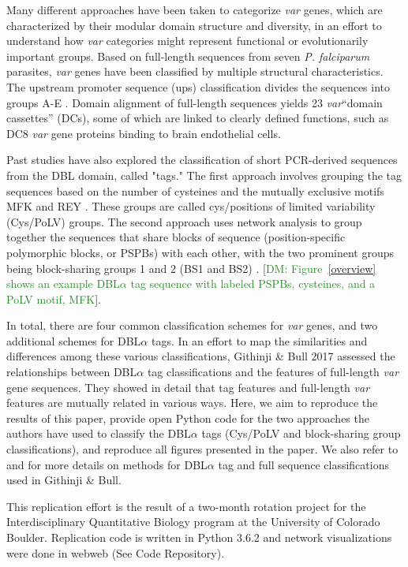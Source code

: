\documentclass[10pt,twocolumn,superscriptaddress]{revtex4-1}
\newcommand{\dieumycom}[1]{[\textcolor{ForestGreen}{DM: #1}]}
\newcommand{\var}{{\it var}\xspace}
\newcommand{\pf}{{\it P. falciparum}\xspace}
\newcommand{\dbla}{{DBL$\alpha$}\xspace}
\newcommand{\cp}{{Cys/PoLV}\xspace}
\newcommand{\paper}{{Githinji \& Bull}\xspace}
\begin{document}
Many different approaches have been taken to categorize \var genes, which are characterized by their modular domain structure and diversity, in an effort to understand how \var categories might represent functional or evolutionarily important groups. Based on full-length sequences from seven \pf parasites, \var genes have been classified by multiple structural characteristics. The upstream promoter sequence (ups) classification divides the sequences into groups A-E \cite{rask2010, vazquez2002}. Domain alignment of full-length sequences yields 23 \var ``domain cassettes'' (DCs), some of which are linked to clearly defined functions, such as DC8 \var gene proteins binding to brain endothelial cells. 



Past studies have also explored the classification of short PCR-derived sequences from the DBL domain, called "tags." The first approach involves grouping the tag sequences based on the number of cysteines and the mutually exclusive motifs MFK and REY \cite{bull2007}. These groups are called cys/positions of limited variability (\cp) groups. The second approach uses network analysis to group together the sequences that share blocks of sequence (position-specific polymorphic blocks, or PSPBs) with each other, with the two prominent groups being block-sharing groups 1 and 2 (BS1 and BS2) \cite{bull2008}. \dieumycom{Figure~\ref{overview} shows an example \dbla tag sequence with labeled PSPBs, cysteines, and a PoLV motif, MFK}.


In total, there are four common classification schemes for \var genes, and two additional schemes for \dbla tags. In an effort to map the similarities and differences among these various classifications, \paper 2017 \cite{githinji2017} assessed the relationships between \dbla tag classifications and the features of full-length \var gene sequences. They showed in detail that tag features and full-length \var features are mutually related in various ways. Here, we aim to reproduce the results of this paper, provide open Python code for the two approaches the authors have used to classify the \dbla tags (\cp and block-sharing group classifications), and reproduce all figures presented in the paper. We also refer to \cite{bull2008, bull2007} and \cite{rask2010} for more details on methods for \dbla tag and full sequence classifications used in \paper \cite{githinji2017}. 

This replication effort is the result of a two-month rotation project for the Interdisciplinary Quantitative Biology program at the University of Colorado Boulder. Replication code is written in Python 3.6.2 and network visualizations were done in webweb (See Code Repository). 
\end{document}

